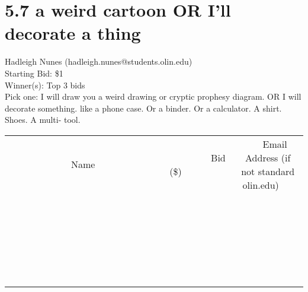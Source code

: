 \documentclass[11pt]{article}
\begin{document}
\section*{5.7 a weird cartoon OR I'll decorate a thing}
Hadleigh Nunes (hadleigh.nunes@students.olin.edu) \\
Starting Bid: \$1 \\
Winner(s): 
Top 3 bids \\
Pick one: I will draw you a weird drawing or cryptic prophesy diagram. OR I will decorate something. like a phone case. Or a binder. Or a calculator. A shirt. Shoes. A multi- tool. \\[6ex]
\begin{tabular}{c c c}
~~~~~~~~~~~~~Name~~~~~~~~~~~~~ & ~~~~~~~~~Bid (\$)~~~~~~~~~ & ~~~Email Address (if not standard olin.edu)~~~ \\
 & & \\
\hline
 & & \\
\hline
 & & \\
\hline
 & & \\
\hline
 & & \\
\hline
 & & \\
\hline
 & & \\
\hline
 & & \\
\hline
 & & \\
\hline
 & & \\
\hline
 & & \\
\hline
 & & \\
\hline
 & & \\
\hline
 & & \\
\hline
 & & \\
\hline
 & & \\
\hline
 & & \\
\hline
 & & \\
\hline
 & & \\
\hline
 & & \\
\hline
 & & \\
\hline
 & & \\
\hline
 & & \\
\hline
 & & \\
\hline
 & & \\
\hline
 & & \\
\hline
\end{tabular}
\clearpage
\end{document}

